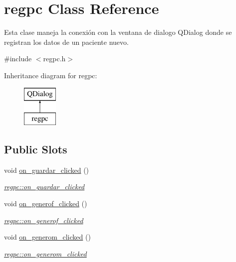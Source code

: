 \hypertarget{classregpc}{}\section{regpc Class Reference}
\label{classregpc}


Esta clase maneja la conexión con la ventana de dialogo Q\+Dialog donde se registran los datos de un paciente nuevo.  




{\ttfamily \#include $<$regpc.\+h$>$}

Inheritance diagram for regpc\+:\begin{figure}[H]
\begin{center}
\leavevmode
\includegraphics[height=2.000000cm]{classregpc}
\end{center}
\end{figure}
\subsection*{Public Slots}
\begin{DoxyCompactItemize}
\item 
void \hyperlink{classregpc_a0126d0e41901f442a138c3fc2236df9a}{on\+\_\+guardar\+\_\+clicked} ()
\begin{DoxyCompactList}\small\item\em \hyperlink{classregpc_a0126d0e41901f442a138c3fc2236df9a}{regpc\+::on\+\_\+guardar\+\_\+clicked} \end{DoxyCompactList}\item 
void \hyperlink{classregpc_aebdc318917c7ea9b3a2aca0e8155f854}{on\+\_\+generof\+\_\+clicked} ()
\begin{DoxyCompactList}\small\item\em \hyperlink{classregpc_aebdc318917c7ea9b3a2aca0e8155f854}{regpc\+::on\+\_\+generof\+\_\+clicked} \end{DoxyCompactList}\item 
void \hyperlink{classregpc_a5e7c8c456ee0a0a51e341d00bd0d8ba3}{on\+\_\+generom\+\_\+clicked} ()
\begin{DoxyCompactList}\small\item\em \hyperlink{classregpc_a5e7c8c456ee0a0a51e341d00bd0d8ba3}{regpc\+::on\+\_\+generom\+\_\+clicked} \end{DoxyCompactList}\end{DoxyCompactItemize}
